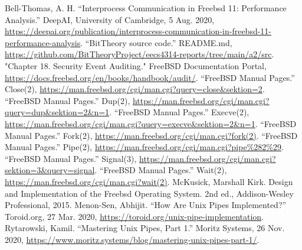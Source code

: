 \documentclass[12pt, dvipsnames, a4paper]{article}
\begin{document}
\begin{thebibliography}{00}
	 Bell-Thomas, A. H. “Interprocess Communication in Freebsd 11: Performance Analysis.” DeepAI, University of Cambridge, 5 Aug. 2020, \href{https://deepai.org/publication/interprocess-communication-in-freebsd-11-performance-analysis}{https://deepai.org/publication/interprocess-communication-in-freebsd-11-performance-analysis}.
	 “BitTheory source code.” README.md, \href{https://github.com/BitTheoryProject/eecs4314-reports/tree/main/a2/src}{https://github.com/BitTheoryProject/eecs4314-reports/tree/main/a2/src}.
	 "Chapter 18. Security Event Auditing." FreeBSD Documentation Portal, \href{https://docs.freebsd.org/en/books/handbook/audit/}{https://docs.freebsd.org/en/books/handbook/audit/}.
	 “FreeBSD Manual Pages.” Close(2), \href{https://man.freebsd.org/cgi/man.cgi?query=close\&sektion=2}{https://man.freebsd.org/cgi/man.cgi?query=close\&sektion=2}.
	 “FreeBSD Manual Pages.” Dup(2), \href{https://man.freebsd.org/cgi/man.cgi?query=dup\&sektion=2\&n=1}{https://man.freebsd.org/cgi/man.cgi?query=dup\&sektion=2\&n=1}.
	 “FreeBSD Manual Pages.” Execve(2), \href{https://man.freebsd.org/cgi/man.cgi?query=execve\&sektion=2\&n=1}{https://man.freebsd.org/cgi/man.cgi?query=execve\&sektion=2\&n=1}.
	 “FreeBSD Manual Pages.” Fork(2), \href{https://man.freebsd.org/cgi/man.cgi?fork(2)}{https://man.freebsd.org/cgi/man.cgi?fork(2)}.
	 “FreeBSD Manual Pages.” Pipe(2), \href{https://man.freebsd.org/cgi/man.cgi?pipe\%282\%29}{https://man.freebsd.org/cgi/man.cgi?pipe\%282\%29}.
	 “FreeBSD Manual Pages.” Signal(3), \href{https://man.freebsd.org/cgi/man.cgi?sektion=3\&query=signal}{https://man.freebsd.org/cgi/man.cgi?sektion=3\&query=signal}.
	 “FreeBSD Manual Pages.” Wait(2), \href{https://man.freebsd.org/cgi/man.cgi?wait(2)}{https://man.freebsd.org/cgi/man.cgi?wait(2)}.
	 McKusick, Marshall Kirk. Design and Implementation of the Freebsd Operating System. 2nd ed., Addison-Wesley Professional, 2015.
	 Menon-Sen, Abhijit. “How Are Unix Pipes Implemented?” Toroid.org, 27 Mar. 2020, \href{https://toroid.org/unix-pipe-implementation}{https://toroid.org/unix-pipe-implementation}.
	Rytarowski, Kamil. “Mastering Unix Pipes, Part 1.” Moritz Systems, 26 Nov. 2020, \href{https://www.moritz.systems/blog/mastering-unix-pipes-part-1/}{https://www.moritz.systems/blog/mastering-unix-pipes-part-1/}.
\end{thebibliography}
\end{document}
